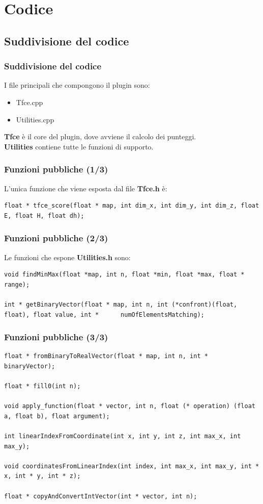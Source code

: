 \documentclass{beamer}
\begin{document}
\section{Codice}
\subsection{Suddivisione del codice}
\begin{frame}
\frametitle{Suddivisione del codice}
I file principali che compongono il plugin sono:
\begin{itemize}
\item{Tfce.cpp}
\item{Utilities.cpp}
\end{itemize}
\vfill
\textbf{Tfce} è il core del plugin, dove avviene il calcolo dei punteggi.\\
\smallskip
\textbf{Utilities} contiene tutte le funzioni di supporto.
\end{frame}

\begin{frame}[fragile]
\frametitle{Funzioni pubbliche (1/3)}
L'unica funzione che viene esposta dal file \textbf{Tfce.h} è:
\begin{center}
\begin{lstlisting}
float * tfce_score(float * map, int dim_x, int dim_y, int dim_z, float E, float H, float dh);
\end{lstlisting}
\end{center}
\end{frame}

\begin{frame}[fragile]
\frametitle{Funzioni pubbliche (2/3)}
Le funzioni che espone \textbf{Utilities.h} sono:
\begin{center}
\begin{lstlisting}
void findMinMax(float *map, int n, float *min, float *max, float * range);

int * getBinaryVector(float * map, int n, int (*confront)(float, float), float value, int *      numOfElementsMatching);
\end{lstlisting}
\end{center}
\end{frame}

\begin{frame}[fragile]
\frametitle{Funzioni pubbliche (3/3)}
\begin{center}
\begin{lstlisting}
float * fromBinaryToRealVector(float * map, int n, int * binaryVector);

float * fill0(int n);

void apply_function(float * vector, int n, float (* operation) (float a, float b), float argument);

int linearIndexFromCoordinate(int x, int y, int z, int max_x, int max_y);

void coordinatesFromLinearIndex(int index, int max_x, int max_y, int * x, int * y, int * z);

float * copyAndConvertIntVector(int * vector, int n);
\end{lstlisting}
\end{center}
\end{frame}
\end{document}
